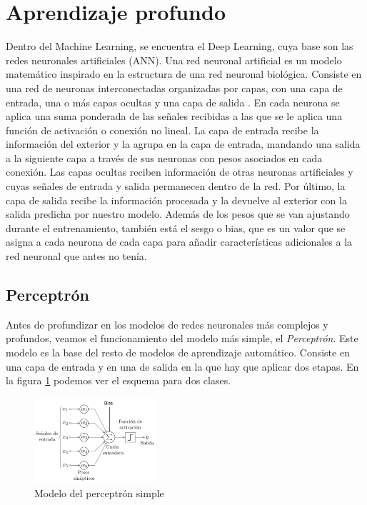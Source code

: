 \section{Aprendizaje profundo}

Dentro del Machine Learning, se encuentra el Deep Learning, cuya base son las redes neuronales artificiales (ANN). Una red neuronal artificial es un modelo matemático inspirado en la estructura de una red neuronal biológica. Consiste en una red de neuronas interconectadas organizadas por capas, con una capa de entrada, una o más capas ocultas y una capa de salida \citep{dolling2002artificial}. En cada neurona se aplica una suma ponderada de las señales recibidas a las que se le aplica una función de activación o conexión no lineal. La capa de entrada recibe la información del exterior y la agrupa en la capa de entrada, mandando una salida a la siguiente capa a través de sus neuronas con pesos asociados en cada conexión. Las capas ocultas reciben información de otras neuronas artificiales y cuyas señales de entrada y salida permanecen dentro de la red. Por último, la capa de salida recibe la información procesada y la devuelve al exterior con la salida predicha por nuestro modelo. Además de los pesos que se van ajustando durante el entrenamiento, también está el sesgo o bias, que es un valor que se asigna a cada neurona de cada capa para añadir características adicionales a la red neuronal que antes no tenía. 


\subsection{Perceptrón}

Antes de profundizar en los modelos de redes neuronales más complejos y profundos, veamos el funcionamiento del modelo más simple, el \textit{Perceptrón}. Este modelo es la base del resto de modelos de aprendizaje automático. Consiste en una capa de entrada y en una de salida en la que hay que aplicar dos etapas. En la figura \ref{img: perceptron} podemos ver el esquema para dos clases.

\begin{figure}[h!]
    \centering
    \includegraphics[width=0.4\textwidth]{img/perceptron.png}
    \caption{Modelo del perceptrón simple}
    \label{img: perceptron}
\end{figure}

